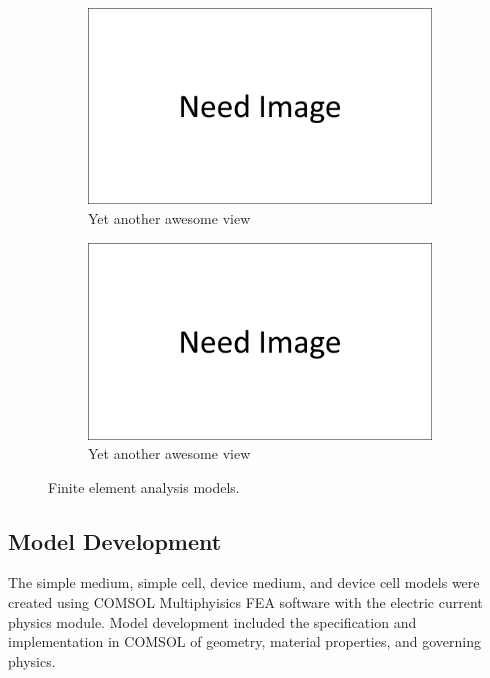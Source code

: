 \begin{figure}
    \\
    \begin{subfigure}[b]{0.45\textwidth}
        \centering
        \includegraphics[width=\textwidth]{images/need_image.png}
        \caption{Yet another awesome view}
        \label{fig:device_medium_fea_model}
    \end{subfigure}
    \hfill
    \begin{subfigure}[b]{0.45\textwidth}
        \centering
        \includegraphics[width=\textwidth]{images/need_image.png}
        \caption{Yet another awesome view}
        \label{fig:device_cell_fea_model}
    \end{subfigure}
    \caption{Finite element analysis models.}
    \label{fig:FEA_models}
\end{figure}


\subsection{Model Development}
\par The simple medium, simple cell, device medium, and device cell models were created using COMSOL Multiphyisics FEA software with the electric current physics module. Model development included the specification and implementation in COMSOL of geometry, material properties, and governing physics.

